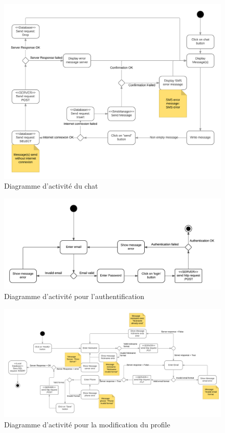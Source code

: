 \documentclass[titlepage, 12pt]{report}
\begin{document}
\begin{figure}[!h]
	\caption{Diagramme d'activité du chat}
	\label{chat_activity_diagram}
	\centering
	\includegraphics[scale=0.6]{Images/diagram/chat_activity_diagram.png}
\end{figure}  

\begin{figure}[!h]
	\caption{Diagramme d'activité pour l'authentification}
	\label{login_activity_diagram}
	\centering
	\includegraphics[scale=0.6]{Images/diagram/login_activity_diagram.png}
\end{figure} 

\begin{figure}[!h]
	\caption{Diagramme d'activité pour la modification du profile}
	\label{modify_profil_activity_diagram}
	\centering
	\includegraphics[scale=0.6]{Images/diagram/modify_profil_activity_diagram.png}
\end{figure} 
\end{document}
